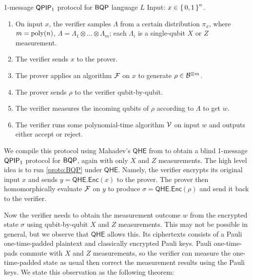\begin{protocol}{1-message $\operatorname{\mathsf{QPIP}}_1$ protocol for $\operatorname{\mathsf{BQP}}$ language $L$}
	\label{proto:BQP}
	Input: $x\in\set{0,1}^n$.
	\begin{enumerate}
		\item On input $x$, the verifier samples $\Lambda$ from a certain distribution $\pi_x$, where $m=\operatorname*{\operatorname{poly}}(n)$, $\Lambda=\Lambda_1\otimes\ldots\otimes\Lambda_m$; each $\Lambda_i$ is a single-qubit $X$ or $Z$ measurement.
		\item The verifier sends $x$ to the prover.
		\item The prover applies an algorithm $\mathcal{F}$  on $x$ to generate $\rho\in\mathcal{B}^{\otimes m}$.
		\item The prover sends $\rho$ to the verifier qubit-by-qubit.
		\item The verifier measures the incoming qubits of $\rho$ according to $\Lambda$ to get $w$.
		\item The verifier runs some polynomial-time algorithm $\mathcal{V}$ on input $w$ and outputs either accept or reject.
	\end{enumerate}
\end{protocol}

We compile this protocol using Mahadev's $\mathsf{QHE}$ from \cite{mahadev_qfhe} to obtain a blind 1-message $\operatorname{\mathsf{QPIP}}_1$ protocol for $\operatorname{\mathsf{BQP}}$, again with only $X$ and $Z$ measurements.
The high level idea is to run \cref{proto:BQP} under $\mathsf{QHE}$.
Namely, the verifier encrypts its original input $x$ and sends $y=\mathsf{QHE.Enc}(x)$ to the prover.
The prover then homomorphically evaluate $\mathcal{F}$ on $y$ to produce $\sigma=\mathsf{QHE.Enc}(\rho)$  and send it back to the verifier.

Now the verifier needs to obtain the measurement outcome $w$ from the encrypted state $\sigma$ using qubit-by-qubit $X$ and $Z$ measurements.
This may not be possible in general, but we observe that $\mathsf{QHE}$ allows this. 
Its ciphertexts consists of a Pauli one-time-padded plaintext and classically encrypted Pauli keys.
Pauli one-time-pads commute with $X$ and $Z$ measurements, so the verifier can measure the one-time-padded state as usual then correct the measurement results using the Pauli keys.
We state this observation as the following theorem:

